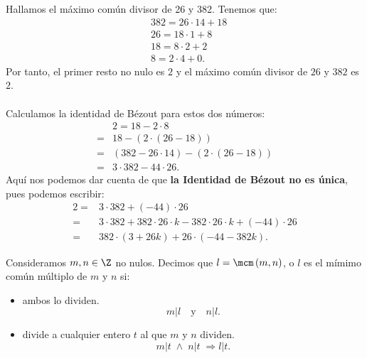 \begin{eg}
\normalfont
 Hallamos el máximo común divisor de 26 y 382. Tenemos que:
 \[
 \begin{split}
 & 382 = 26 \cdot 14 + 18 \\
 & 26 = 18 \cdot 1 + 8 \\
 & 18 = 8 \cdot 2 + 2 \\
 & 8 = 2 \cdot 4 + 0.
 \end{split}
 \]
 Por tanto, el primer resto no nulo es $\displaystyle 2 $ y el máximo común divisor de $\displaystyle 26 $ y $\displaystyle 382 $ es $\displaystyle 2 $. \\ \\
 Calculamos la identidad de Bézout para estos dos números:
 \[
 \begin{split}
 &2 = 18 - 2 \cdot 8 \\
 = & 18 - \left(2 \cdot \left(26-18\right)\right)\\
 = & \left(382-26 \cdot14\right) -\left(2 \cdot \left(26 -18\right)\right) \\
 = & 3 \cdot 382 - 44 \cdot 26.
 \end{split}
 \]
 Aquí nos podemos dar cuenta de que \textbf{la Identidad de Bézout no es única}, pues podemos escribir:
\[
\begin{split}
	2 = & 3 \cdot 382 + \left(-44\right) \cdot 26 \\
	= & 3 \cdot 382 + 382 \cdot 26 \cdot k - 382 \cdot 26 \cdot k + \left(-44\right) \cdot 26\\
	= & 382 \cdot \left(3 + 26k\right) + 26 \cdot \left(-44 -382k\right).
\end{split}
\]
 \end{eg}

 \begin{fdefinition}
 \normalfont Consideramos $\displaystyle m,n \in \Z $ no nulos. Decimos que $\displaystyle l = \mcm\left(m,n\right) $, o $\displaystyle l $ es el mímimo común múltiplo de $\displaystyle m $ y $\displaystyle n $ si:
 \begin{itemize}
 \item ambos lo dividen.
	 \[m | l \quad \text{y} \quad n | l .\]
\item divide a cualquier entero $\displaystyle t $ al que $\displaystyle m $ y $\displaystyle n $ dividen. 
	\[m | t \; \land \; n | t \;\Rightarrow l | t .\]
 \end{itemize}
 \end{fdefinition}
 
